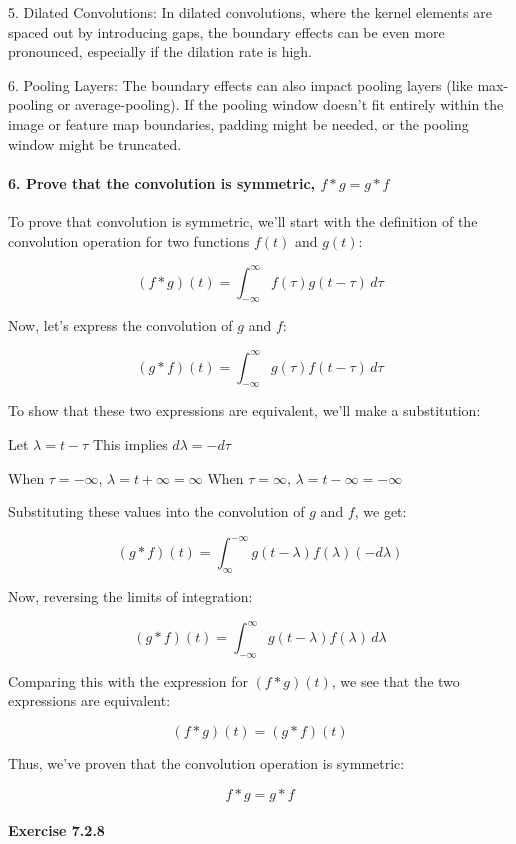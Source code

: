 5. Dilated Convolutions: In dilated convolutions, where the kernel elements are spaced out by introducing gaps, the boundary effects can be even more pronounced, especially if the dilation rate is high.

6. Pooling Layers: The boundary effects can also impact pooling layers (like max-pooling or average-pooling). If the pooling window doesn't fit entirely within the image or feature map boundaries, padding might be needed, or the pooling window might be truncated.

\paragraph{6. Prove that the convolution is symmetric, \(f * g = g * f\)}

To prove that convolution is symmetric, we'll start with the definition of the convolution operation for two functions \( f(t) \) and \( g(t) \):

\[ (f * g)(t) = \int_{-\infty}^{\infty} f(\tau) g(t - \tau) \, d\tau \]

Now, let's express the convolution of \( g \) and \( f \):

\[ (g * f)(t) = \int_{-\infty}^{\infty} g(\tau) f(t - \tau) \, d\tau \]

To show that these two expressions are equivalent, we'll make a substitution:

Let \( \lambda = t - \tau \)
This implies \( d\lambda = -d\tau \)

When \( \tau = -\infty \), \( \lambda = t + \infty = \infty \)
When \( \tau = \infty \), \( \lambda = t - \infty = -\infty \)

Substituting these values into the convolution of \( g \) and \( f \), we get:

\[ (g * f)(t) = \int_{\infty}^{-\infty} g(t - \lambda) f(\lambda) (-d\lambda) \]

Now, reversing the limits of integration:

\[ (g * f)(t) = \int_{-\infty}^{\infty} g(t - \lambda) f(\lambda) \, d\lambda \]

Comparing this with the expression for \( (f * g)(t) \), we see that the two expressions are equivalent:

\[ (f * g)(t) = (g * f)(t) \]

Thus, we've proven that the convolution operation is symmetric:

\[ f * g = g * f \]


\paragraph{Exercise 7.2.8}

